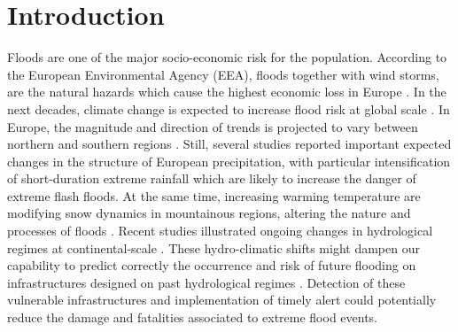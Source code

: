 \chapter{Introduction}
\label{chp:introduction}

\newcommand{\keyword}[1]{\textbf{#1}}
\newcommand{\tabhead}[1]{\textbf{#1}}
\newcommand{\code}[1]{\texttt{#1}}
\newcommand{\file}[1]{\texttt{\bfseries#1}}
\newcommand{\option}[1]{\texttt{\itshape#1}}

Floods are one of the major socio-economic risk for the population. According to the European Environmental Agency (EEA), floods together with wind storms, are the natural hazards which cause the highest economic loss  
in Europe \autocite{european_environment_agency_flood_2013}.
In the next decades, climate change is expected to increase flood risk at global scale \autocite{milly_increasing_2002,hirabayashi_global_2008,hirabayashi_global_2013}. In Europe, the magnitude and direction of trends is projected to vary between northern and southern regions \autocite{dankers_flood_2009,alfieri_global_2015, thober_multi-model_2018}. Still, several studies reported important expected changes in the structure of European precipitation, with particular intensification of short-duration extreme rainfall \autocite{christensen_intensification_2004,zolina_changing_2010,westra_global_2013} which are likely to increase the danger of extreme flash floods. 
At the same time, increasing warming temperature are modifying snow dynamics in mountainous regions, altering the nature and processes of floods \autocite{koplin_seasonality_2014,hall_understanding_2014,berghuijs_precipitation_2014}. 
Recent studies illustrated ongoing changes in hydrological regimes at continental-scale \autocite{bloschl_changing_2017,stahl_filling_2012}.
These hydro-climatic shifts might dampen our capability to predict correctly the occurrence and risk of future flooding on infrastructures designed on past hydrological regimes \autocite{milly_increasing_2002}.
Detection of these vulnerable infrastructures and implementation of timely alert could potentially reduce the damage and fatalities associated to extreme flood events.\\
 
